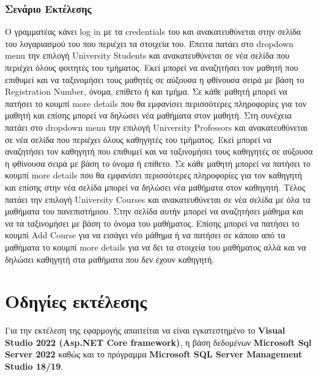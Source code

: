 \documentclass[12pt]{article}
\begin{document}
	
\subsubsection{Σενάριο Εκτέλεσης}
Ο γραμματέας κάνει log in με τα credentials του και ανακατευθύνεται στην σελίδα του λογαριασμού του που περιέχει τα στοιχεία του. Έπειτα πατάει στο dropdown menu την επιλογή University Students και ανακατευθύνεται σε νέα σελίδα που περιέχει όλους φοιτητές του τμήματος. Εκεί μπορεί να αναζητήσει τον μαθητή που επιθυμεί και να ταξινομήσει τους μαθητές σε αύξουσα η φθίνουσα σειρά με βάση το Registration Number, όνομα, επίθετο ή και τμήμα. Σε κάθε μαθητή μπορεί να πατήσει το κουμπί more details που θα εμφανίσει περισσότερες πληροφορίες  για τον μαθητή και επίσης μπορεί να δηλώσει νέα μαθήματα στον μαθητή. Στη συνέχεια πατάει στο dropdown menu την επιλογή University Professors και ανακατευθύνεται σε νέα σελίδα που περιέχει όλους καθηγητές του τμήματος. Εκεί μπορεί να αναζητήσει τον καθηγητή που επιθυμεί και να ταξινομήσει τους καθηγητές σε αύξουσα η φθίνουσα σειρά με βάση το  όνομα ή  επίθετο. Σε κάθε μαθητή μπορεί να πατήσει το κουμπί more details που θα εμφανίσει περισσότερες πληροφορίες  για τον καθηγητή και επίσης στην νέα σελίδα μπορεί να δηλώσει νέα μαθήματα στον καθηγητή. Τέλος πατάει την επιλογή University Courses και ανακατευθύνεται σε νέα σελίδα με όλα τα μαθήματα του πανεπιστήμιου. Στην σελίδα αυτήν μπορεί να αναζητήσει μάθημα και να τα ταξινομήσει με βάση το όνομα του μαθήματος. Επίσης μπορεί να πατήσει το κουμπί Add Course για να εισάγει νέο μάθημα ή να πατήσει σε κάποιο από τα μαθήματα το κουμπί more details για να δει τα στοιχεία του μαθήματος αλλά και να δηλώσει καθηγητή στα μαθήματα που δεν έχουν καθηγητή.

	

\section{Οδηγίες εκτέλεσης}
Για την εκτέλεση της εφαρμογής απαιτείται να είναι εγκατεστημένο το \textbf{Visual Studio 2022 (Asp.NET Core framework)}, η βάση δεδομένων \textbf{Microsoft Sql Server 2022} καθώς και το πρόγραμμα \textbf{Microsoft SQL Server Management Studio 18/19}.
	
	
\end{document}
